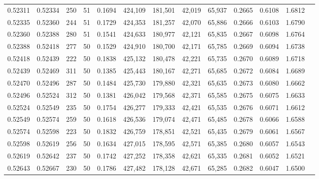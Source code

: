 \begin{tabular}{rrrrrrrrrrrrr}
0.52311 & 0.52334 &   250 &  51 &                                     0.1694 & 424,109 & 181,501 &  42,019 &  65,937 & 0.2665 & 0.6108 & 1.6812 \\
0.52335 & 0.52360 &   244 &  51 &                                     0.1729 & 424,353 & 181,257 &  42,070 &  65,886 & 0.2666 & 0.6103 & 1.6790 \\
0.52360 & 0.52388 &   280 &  51 &                                     0.1541 & 424,633 & 180,977 &  42,121 &  65,835 & 0.2667 & 0.6098 & 1.6764 \\
0.52388 & 0.52418 &   277 &  50 &                                     0.1529 & 424,910 & 180,700 &  42,171 &  65,785 & 0.2669 & 0.6094 & 1.6738 \\
0.52418 & 0.52439 &   222 &  50 &                                     0.1838 & 425,132 & 180,478 &  42,221 &  65,735 & 0.2670 & 0.6089 & 1.6718 \\
0.52439 & 0.52469 &   311 &  50 &                                     0.1385 & 425,443 & 180,167 &  42,271 &  65,685 & 0.2672 & 0.6084 & 1.6689 \\
0.52470 & 0.52496 &   287 &  50 &                                     0.1484 & 425,730 & 179,880 &  42,321 &  65,635 & 0.2673 & 0.6080 & 1.6662 \\
0.52496 & 0.52524 &   312 &  50 &                                     0.1381 & 426,042 & 179,568 &  42,371 &  65,585 & 0.2675 & 0.6075 & 1.6633 \\
0.52524 & 0.52549 &   235 &  50 &                                     0.1754 & 426,277 & 179,333 &  42,421 &  65,535 & 0.2676 & 0.6071 & 1.6612 \\
0.52549 & 0.52574 &   259 &  50 &                                     0.1618 & 426,536 & 179,074 &  42,471 &  65,485 & 0.2678 & 0.6066 & 1.6588 \\
0.52574 & 0.52598 &   223 &  50 &                                     0.1832 & 426,759 & 178,851 &  42,521 &  65,435 & 0.2679 & 0.6061 & 1.6567 \\
0.52598 & 0.52619 &   256 &  50 &                                     0.1634 & 427,015 & 178,595 &  42,571 &  65,385 & 0.2680 & 0.6057 & 1.6543 \\
0.52619 & 0.52642 &   237 &  50 &                                     0.1742 & 427,252 & 178,358 &  42,621 &  65,335 & 0.2681 & 0.6052 & 1.6521 \\
0.52643 & 0.52667 &   230 &  50 &                                     0.1786 & 427,482 & 178,128 &  42,671 &  65,285 & 0.2682 & 0.6047 & 1.6500 \\

\end{tabular}
